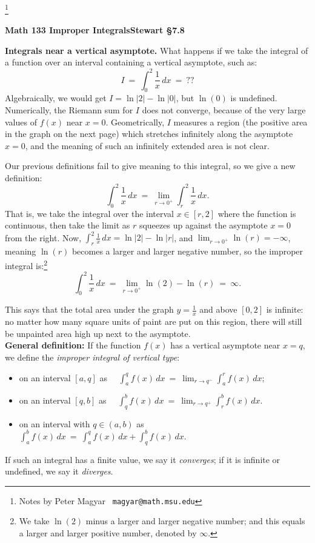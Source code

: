 \documentclass[11pt]{article}
\newcommand{\ds}{\displaystyle}
\begin{document}
\footnote[0]{Notes by Peter Magyar \ {\tt magyar@math.msu.edu}}
\vspace{-1em}

\centerline{\bf Math 133\hspace{1.5em} \hfill{\Large\bf
Improper Integrals}\hfill Stewart \S7.8}
\vspace{1em}

\noindent 
{\bf Integrals near a vertical asymptote.} What happens if we take the integral of a function over an interval containing a vertical asymptote, such as:
$$
I \ = \ \int_0^2 \frac{1}{x}\,dx \ =\ ??
$$
Algebraically, we would get $I=\ln|2| -\ln|0|$, but $\ln(0)$ is undefined.
Numerically, the Riemann sum for $I$ does not converge, because of the very large values of $f(x)$ near $x=0$. Geometrically, $I$ measures a
region (the positive area in the graph on the next page) which stretches infinitely 
along the asymptote $x=0$, and the meaning of such an
infinitely extended area is not clear.
 
Our previous definitions fail to give meaning to this integral, so we give a new definition:
$$
\int_0^2 \frac{1}{x}\,dx \ =\  \lim_{r\to 0^+} \int_r^2 \frac{1}{x}\,dx.
$$
That is, we take the integral over the interval $x\in [r,2]$ where the function is continuous, then take the limit as $r$ squeezes up against the asymptote $x=0$ from the right.
Now, $\int_r^2\frac1x\,dx= \ln|2|-\ln|r|$, 
and $\lim_{r\to 0^+} \ln(r)=-\infty$, meaning $\ln(r)$ becomes a larger and larger
negative number, so the improper integral is:\footnote{
We take $\ln(2)$ minus a larger and larger negative number; 
and this equals a larger and larger positive number, denoted by $\infty$.
}
$$
\int_0^2 \frac1x\,dx\ =\
\lim_{r\to 0^+} \ln(2)-\ln(r) 
\ =\ \infty.
$$

This says that the total area under the graph $y=\frac1x$ and above $[0,2]$ is infinite: no matter how many square units of paint are put on this region, there will still be unpainted area high up next to the asymptote.
\\[1em]
{\bf General definition:}
If the function $f(x)$ has a vertical asymptote near $x=q$,
we define the {\it improper integral of vertical type}:
\begin{itemize}
\item on an interval $[a,q]$ as \ \
$\ds
\int_a^q f(x)\,dx \ =\ \lim_{r\to q^-}\int_a^r f(x)\,dx;
$
\item on an interval $[q,b]$ as \ \
$\ds
\int_q^b f(x)\,dx \ =\ \lim_{r\to q^+}\int_r^b f(x)\,dx.
$
\item on an interval with $q\in(a,b)$ as \ \
$\ds
\int_a^b f(x)\,dx \ =\ \int_a^q f(x)\,dx + \int_q^b f(x)\,dx.
$
\end{itemize}
If such an integral has a finite value, we say it {\it converges};
if it is infinite or undefined, we say it {\it diverges}.
%
\newpage
\end{document}
